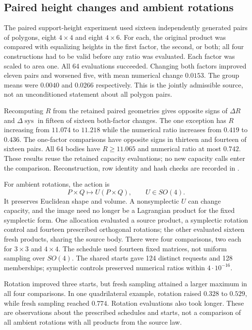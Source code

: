\subsection{Paired height changes and ambient rotations}
\label{app:ds-deformations}

The paired support-height experiment used sixteen independently generated
pairs of polygons, eight $4\times4$ and eight $4\times6$. For each,
the original product was compared with equalizing heights in the first
factor, the second, or both; all four constructions had to be valid before
any ratio was evaluated. Each factor was scaled to area one. All 64
evaluations succeeded. Changing both factors improved eleven pairs and
worsened five, with mean numerical change $0.0153$. The group means were
$0.0040$ and $0.0266$ respectively. This is the jointly admissible source,
not an unconditioned statement about all polygon pairs.

Recomputing $R$ from the retained paired geometries gives opposite signs
of $\Delta R$ and $\Delta\widehat{\operatorname{sys}}$ in fifteen of
sixteen both-factor changes. The one exception has $R$ increasing from
$11.074$ to $11.218$ while the numerical ratio increases from $0.419$
to $0.436$. The one-factor comparisons have opposite signs in thirteen
and fourteen of sixteen pairs. All 64 bodies have $R\geq11.065$ and
numerical ratio at most $0.742$. These results reuse the retained capacity
evaluations; no new capacity calls enter the comparison. Reconstruction,
row identity and hash checks are recorded in
.

For ambient rotations, the action is
\[
 P\times Q\longmapsto U(P\times Q),\qquad U\in SO(4).
\]
It preserves Euclidean shape and volume. A nonsymplectic $U$ can change
capacity, and the image need no longer be a Lagrangian product for the
fixed symplectic form. One allocation evaluated a source product, a
symplectic rotation control and fourteen prescribed orthogonal rotations;
the other evaluated sixteen fresh products, sharing the source body.
There were four comparisons, two each for $3\times3$ and $4\times4$.
The schedule used fourteen fixed matrices, not uniform sampling over
$SO(4)$. The shared starts gave 124 distinct requests and 128 memberships;
symplectic controls preserved numerical ratios within $4\cdot10^{-16}$.

Rotation improved three starts, but fresh sampling attained a larger
maximum in all four comparisons. In one quadrilateral example, rotation
raised $0.328$ to $0.529$, while fresh sampling reached $0.774$.
Rotation evaluations also took longer. These are observations about the
prescribed schedules and starts, not a comparison of all ambient rotations
with all products from the source law.

